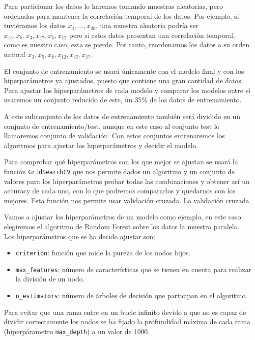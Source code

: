 Para particionar los datos lo haremos tomando muestras aleatorias, pero ordenadas para mantener la correlación temporal de los datos. Por ejemplo, si tuviéramos los datos $x_1, \dots, x_{20}$, una muestra aleatoria podría ser $x_{15}, x_8, x_3, x_{17}, x_5, x_{12}$ pero si estos datos presentan una correlación temporal, como es nuestro caso, esta se pierde. Por tanto, reordenamos los datos a su orden natural $x_3, x_5, x_8, x_{12}, x_{15}, x_{17}$. 

El conjunto de entrenamiento se usará únicamente con el modelo final y con los hiperparámetros ya ajustados, puesto que contiene una gran cantidad de datos. Para ajustar los hiperparámetros de cada modelo y comparar los modelos entre sí usaremos un conjunto reducido de este, un 35\% de los datos de entrenamiento.

A este subconjunto de los datos de entrenamiento también será dividido en un conjunto de entrenamiento/test, aunque en este caso al conjunto test lo llamaremos conjunto de validación. Con estos conjuntos entrenaremos los algoritmos para ajustar los hiperparámetros y decidir el modelo.

Para comprobar qué hiperparámetros son los que mejor se ajustan se usará la función \texttt{GridSearchCV} \cite{scikitgrid} que nos permite dados un algoritmo y un conjunto de valores para los hiperparámetros probar todas las combinaciones y obtener así un accuracy de cada uno, con lo que podremos compararlos y quedarnos con los mejores. Esta función nos permite usar validación cruzada. La validación cruzada 

Vamos a ajustar los hiperparámetros de un modelo como ejemplo, en este caso elegiremos el algoritmo de Random Forest sobre los datos la muestra paralela. Los hiperparámetros que se ha decido ajustar son:
\begin{itemize}
    \item \texttt{criterion}: función que mide la pureza de los nodos hijos.
    \item \texttt{max\_features}: número de características que se tienen en cuenta para realizar la división de un nodo.
    \item \texttt{n\_estimators}: número de árboles de decisión que participan en el algoritmo.
\end{itemize}

Para evitar que una rama entre en un bucle infinito devido a que no es capaz de dividir correctamente los nodos se ha fijado la profundidad máxima de cada rama (hiperpárametro \texttt{max\_depth}) a un valor de 1000. 


